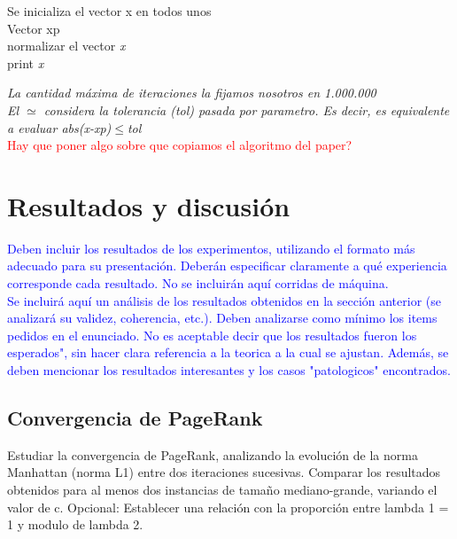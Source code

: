 \documentclass[a4paper]{article}
\begin{document}
\IncMargin{1em}
\begin{algorithm}

\BlankLine

Se inicializa el vector x en todos unos \\
Vector xp\\
normalizar el vector \emph{x} \\
print \emph{x}
\end{algorithm}\DecMargin{1em}
\textit{La cantidad m\'axima de iteraciones la fijamos nosotros en 1.000.000 \\
El $\simeq$ considera la tolerancia (tol) pasada por parametro. Es decir, es equivalente a evaluar abs(x-xp)$\leq$tol} \\
\textcolor{red}{Hay que poner algo sobre que copiamos el algoritmo del paper?}


\newpage
\section{Resultados y discusi\'on}
\textcolor{blue}{Deben incluir los resultados de los experimentos, utilizando el formato m\'as adecuado
para su presentaci\'on. Deber\'an especificar claramente a qu\'e experiencia corresponde
cada resultado. No se incluir\'an aqu\'i corridas de m\'aquina.\\
Se incluir\'a aqu\'i un an\'alisis de los resultados obtenidos en la secci\'on anterior (se analizar\'a su validez, coherencia, etc.). Deben analizarse como m\'inimo los items pedidos en el enunciado. No es aceptable decir que los resultados fueron los esperados", sin hacer
clara referencia a la teorica a la cual se ajustan. Adem\'as, se deben mencionar los resultados
interesantes y los casos "patologicos" encontrados.
}
\\
\subsection{Convergencia de PageRank}
Estudiar la convergencia de PageRank, analizando la evoluci\'on de la norma Manhattan
(norma L1) entre dos iteraciones sucesivas. Comparar los resultados obtenidos para
al menos dos instancias de tama\~no mediano-grande, variando el valor de c. Opcional:
Establecer una relaci\'on con la proporci\'on entre lambda 1 = 1 y modulo de lambda 2.
\end{document}
